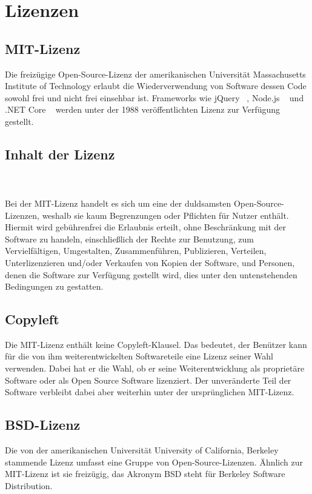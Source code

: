 \chapter{Lizenzen}
\section{MIT-Lizenz}\label{sec:MIT}
Die freizügige Open-Source-Lizenz der amerikanischen Universität Massachusetts Institute of Technology erlaubt die Wiederverwendung von Software dessen Code sowohl frei und nicht frei einsehbar ist. Frameworks wie jQuery ~\cite{jQueryLicense}, Node.js ~\cite{NodeJsLicense} und .NET Core ~\cite{NetCoreLicense} werden unter der 1988 veröffentlichten Lizenz zur Verfügung gestellt.

\section*{Inhalt der Lizenz}
\\ \cite{MITLicense} \\
Bei der MIT-Lizenz handelt es sich um eine der duldsamsten Open-Source-Lizenzen, weshalb sie kaum Begrenzungen oder Pflichten für Nutzer enthält. Hiermit wird gebührenfrei die Erlaubnis erteilt, ohne Beschränkung mit der Software zu handeln, einschließlich der Rechte zur Benutzung, zum Vervielfältigen, Umgestalten, Zusammenführen, Publizieren, Verteilen, Unterlizenzieren und/oder Verkaufen von Kopien der Software, und Personen, denen die Software zur Verfügung gestellt wird, dies unter den untenstehenden Bedingungen zu gestatten.
\section*{Copyleft}
Die MIT-Lizenz enthält keine Copyleft-Klausel. Das bedeutet, der Benützer kann für die von ihm weiterentwickelten Softwareteile eine Lizenz seiner Wahl verwenden. Dabei hat er die Wahl, ob er seine Weiterentwicklung als proprietäre Software oder als Open Source Software lizenziert.  Der unveränderte Teil der Software verbleibt dabei aber weiterhin unter der ursprünglichen MIT-Lizenz.

\newpage


\section{BSD-Lizenz}\label{sec:BSD}
Die von der amerikanischen Universität University of California, Berkeley stammende Lizenz umfasst eine Gruppe von Open-Source-Lizenzen. Ähnlich zur MIT-Lizenz ist sie freizügig, das Akronym BSD steht für Berkeley Software Distribution.

